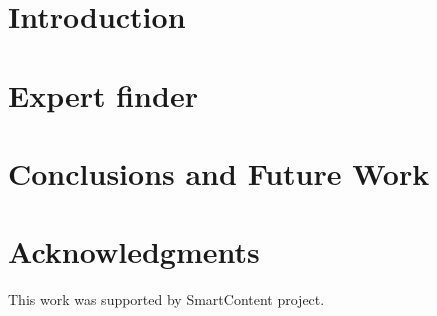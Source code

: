 \documentclass{llncs}
\begin{document}
\section{Introduction}\label{sec:Introduction}


%



\section{Expert finder}\label{sec:Motivation}





%


\section{Conclusions and Future Work}\label{sec:Conclusions}





\section*{Acknowledgments}

This work was supported by SmartContent project.



%






\clearpage
{} %
\renewcommand{\indexname}{Author Index}
\printindex \clearpage
{} %
\renewcommand{\indexname}{Subject Index}
 
\end{document}
